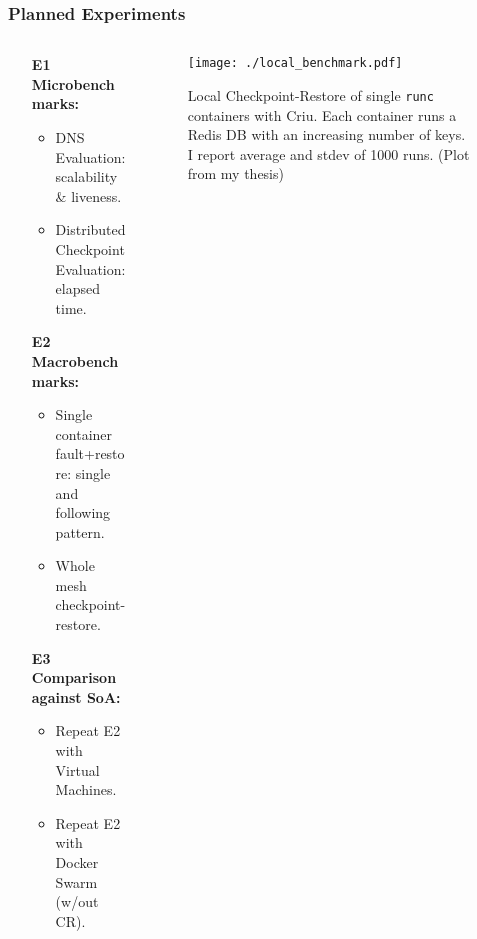 \documentclass[9pt,    %
    english,            %
    xcolor=table,       %
    envcountsect,        %
    aspectratio=169     %
]{beamer}
\begin{document}
\begin{frame}
    \frametitle{Planned Experiments}
    
    \begin{columns}[t]
        \begin{column}{.4\textwidth}
            \begin{enumerate}
                \item[\textbf{E1}] \textbf{Microbenchmarks:}
                \begin{itemize}
                    \item DNS Evaluation: scalability \& liveness.
                    \item Distributed Checkpoint Evaluation: elapsed time.
                \end{itemize}
                \item[\textbf{E2}] \textbf{Macrobenchmarks:}
                \begin{itemize}
                    \item Single container fault+restore: single and following pattern.
                    \item Whole mesh checkpoint-restore.
                \end{itemize}
                \item[\textbf{E3}] \textbf{Comparison against SoA:}
                \begin{itemize}
                    \item Repeat E2 with Virtual Machines.
                    \item Repeat E2 with Docker Swarm (w/out CR).
                \end{itemize}
            \end{enumerate}
        \end{column} \hfill
        \begin{column}{.6\textwidth}
            \begin{figure}[h!]
                \centering
                \texttt{[image: ./local\_benchmark.pdf]}
                \caption{Local Checkpoint-Restore of single \texttt{runc} containers with Criu. Each container runs a Redis DB with an increasing number of keys. I report average and stdev  of 1000 runs. (Plot from my thesis)}
            \end{figure}
        \end{column}
    \end{columns}

\end{frame}
\end{document}
